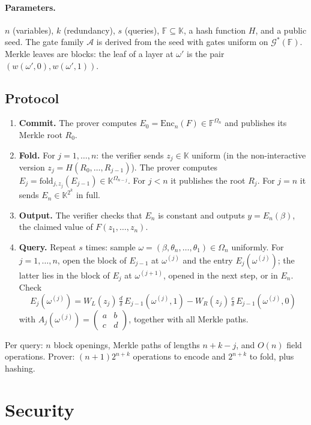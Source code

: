 \documentclass[11pt]{article}
\theoremstyle{definition}
\newcommand{\F}{\mathbb{F}}
\newcommand{\K}{\mathbb{K}}
\newcommand{\Enc}{\mathrm{Enc}}
\newcommand{\fold}{\mathrm{fold}}
\newcommand{\Gs}{\mathcal{G}^{*}}
\begin{document}
\paragraph{Parameters.} $n$ (variables), $k$ (redundancy), $s$ (queries), $\F\subseteq\K$, a hash
function $H$, and a public seed. The gate family $\mathcal{A}$ is derived from the seed with
gates uniform on $\Gs(\F)$. Merkle leaves are blocks: the leaf of a layer at $\omega'$ is the pair
$(w(\omega',0),w(\omega',1))$.

\subsection{Protocol}

\begin{enumerate}[leftmargin=*]
\item \textbf{Commit.} The prover computes $E_0=\Enc_n(F)\in\F^{\Omega_n}$ and publishes its Merkle root $R_0$.
\item \textbf{Fold.} For $j=1,\dots,n$: the verifier sends $z_j\in\K$ uniform (in the non-interactive
version $z_j=H(R_0,\dots,R_{j-1})$). The prover computes $E_j=\fold_{j,z_j}(E_{j-1})\in\K^{\Omega_{n-j}}$.
For $j<n$ it publishes the root $R_j$. For $j=n$ it sends $E_n\in\K^{2^k}$ in full.
\item \textbf{Output.} The verifier checks that $E_n$ is constant and outputs $y=E_n(\beta)$, the
claimed value of $F(z_1,\dots,z_n)$.
\item \textbf{Query.} Repeat $s$ times: sample $\omega=(\beta,\theta_n,\dots,\theta_1)\in\Omega_n$
uniformly. For $j=1,\dots,n$, open the block of $E_{j-1}$ at $\omega^{(j)}$ and the entry
$E_j(\omega^{(j)})$; the latter lies in the block of $E_j$ at $\omega^{(j+1)}$, opened in the next
step, or in $E_n$. Check
\[
E_j(\omega^{(j)})=W_L(z_j)\,\tfrac{d}{\delta}\,E_{j-1}(\omega^{(j)},1)-W_R(z_j)\,\tfrac{c}{\delta}\,E_{j-1}(\omega^{(j)},0)
\]
with $A_j(\omega^{(j)})=\begin{pmatrix}a&b\\c&d\end{pmatrix}$, together with all Merkle paths.
\end{enumerate}

Per query: $n$ block openings, Merkle paths of lengths $n+k-j$, and $O(n)$ field operations.
Prover: $(n+1)2^{n+k}$ operations to encode and $2^{n+k}$ to fold, plus hashing.

\section{Security}\label{sec:security}
\end{document}
